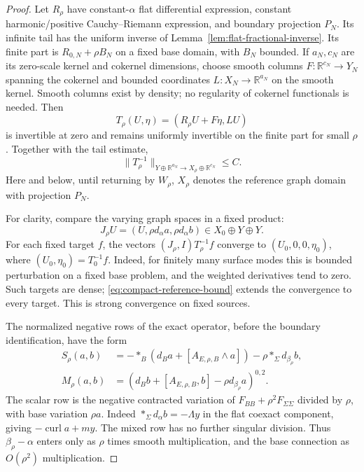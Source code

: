 \documentclass[11pt]{amsart}
\theoremstyle{definition}
\theoremstyle{remark}
\theoremstyle{plain}
\newcommand{\RR}{\mathbb{R}}
\begin{document}
\begin{proof}
Let $R_\rho$ have constant-$\alpha$ flat differential expression,
constant harmonic/positive Cauchy--Riemann expression, and boundary
projection $P_N$. Its infinite tail has the uniform inverse of
Lemma~\ref{lem:flat-fractional-inverse}. Its finite part is
$R_{0,N}+\rho B_N$ on a fixed base domain, with $B_N$ bounded.
If $a_N,c_N$ are its zero-scale kernel and cokernel dimensions,
choose smooth columns $F:\RR^{c_N}\to Y_N$ spanning the cokernel
and bounded coordinates $L:X_N\to\RR^{a_N}$ on the smooth
kernel. Smooth columns exist by density; no regularity of cokernel
functionals is needed. Then
\begin{equation}\label{eq:compact-reference-stabilization}
 T_\rho(U,\eta)=(R_\rho U+F\eta,LU)
\end{equation}
is invertible at zero and remains uniformly invertible on the
finite part for small $\rho$. Together with the tail estimate,
\begin{equation}\label{eq:compact-reference-bound}
 \|T_\rho^{-1}\|_{Y\oplus\RR^{a_N}
                    \to X_\rho\oplus\RR^{c_N}}\leq C.
\end{equation}
Here and below, until returning by $W_\rho$, $X_\rho$ denotes
the reference graph domain with projection $P_N$.

For clarity, compare the varying graph spaces in a fixed product:
\begin{equation}\label{eq:compact-graph-embedding}
 J_\rho U=(U,\rho d_\alpha a,\rho d_\alpha b)
                        \in X_0\oplus Y\oplus Y.
\end{equation}
For each fixed target $f$, the vectors
$(J_\rho,I)T_\rho^{-1}f$ converge to $(U_0,0,0,\eta_0)$,
where $(U_0,\eta_0)=T_0^{-1}f$. Indeed, for finitely many surface
modes this is bounded perturbation on a fixed base problem, and
the weighted derivatives tend to zero. Such targets are dense;
\eqref{eq:compact-reference-bound} extends the convergence to
every target. This is strong convergence on fixed sources.

The normalized negative rows of the exact operator, before the
boundary identification, have the form
\begin{equation}\label{eq:compact-normalized-rows}
 \begin{split}
 S_\rho(a,b)&=-*_B(d_Ba+[A_{E,\rho,B}\wedge a])
                           -\rho *_\Sigma d_{\beta_\rho}b,\\
 M_\rho(a,b)&=(d_Bb+[A_{E,\rho,B},b]
                              -\rho d_{\beta_\rho}a)^{0,2}.
 \end{split}
\end{equation}
The scalar row is the negative contracted variation of
$F_{BB}+\rho^2F_{\Sigma\Sigma}$ divided by $\rho$, with base
variation $\rho a$. Indeed $*_\Sigma d_\alpha b=-\Lambda y$
in the flat coexact component, giving $-\operatorname{curl}a+my$.
The mixed row
has no further singular division. Thus $\beta_\rho-\alpha$ enters
only as $\rho$ times smooth multiplication, and the base connection
as $O(\rho^2)$ multiplication.


\end{proof}
\end{document}

